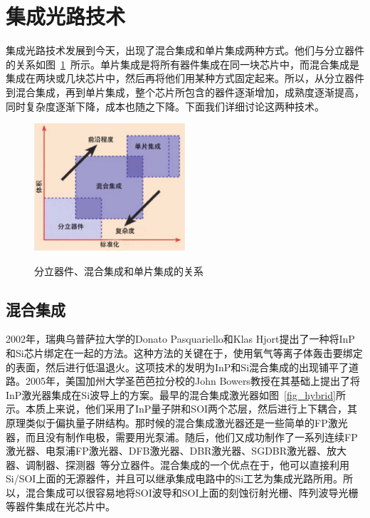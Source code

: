 \documentclass{ZJUthesis}
\begin{document}
\section{集成光路技术}

集成光路技术发展到今天，出现了混合集成和单片集成两种方式。他们与分立器件的关系如图~\ref{fig_integrations}~所示。单片集成是将所有器件集成在同一块芯片中，而混合集成是集成在两块或几块芯片中，然后再将他们用某种方式固定起来。所以，从分立器件到混合集成，再到单片集成，整个芯片所包含的器件逐渐增加，成熟度逐渐提高，同时复杂度逐渐下降，成本也随之下降。下面我们详细讨论这两种技术。

\begin{figure}[htbp]
  \centering
  \includegraphics[width=0.5\textwidth]{./Pictures/integrations.eps}\\
  \caption{分立器件、混合集成和单片集成的关系}
  \label{fig_integrations}
\end{figure}

\subsection{混合集成}

2002年，瑞典乌普萨拉大学的Donato Pasquariello和Klas Hjort提出了一种将InP和Si芯片绑定在一起的方法\cite{Pasquariello2002Plasma}。这种方法的关键在于，使用氧气等离子体轰击要绑定的表面，然后进行低温退火。这项技术的发明为InP和Si混合集成的出现铺平了道路。2005年，美国加州大学圣芭芭拉分校的John Bowers教授在其基础上提出了将InP激光器集成在Si波导上的方案\cite{Park2005Hybrid}。最早的混合集成激光器如图~\ref{fig_hybrid}所示。本质上来说，他们采用了InP量子阱和SOI两个芯层，然后进行上下耦合，其原理类似于偏执量子阱结构。那时候的混合集成激光器还是一些简单的FP激光器，而且没有制作电极，需要用光泵浦。随后，他们又成功制作了一系列连续FP激光器\cite{Fang2006A}、电泵浦FP激光器\cite{Fang2006Electrically}、DFB激光器\cite{Srinivasan2011Design}、DBR激光器\cite{Fang2008A}、SGDBR激光器\cite{Sysak2008Integration}、放大器\cite{Sysak2008Integration}、调制器\cite{Kuo2008High}、探测器\cite{Park2007A}~等分立器件。混合集成的一个优点在于，他可以直接利用Si/SOI上面的无源器件，并且可以继承集成电路中的Si工艺为集成光路所用。所以，混合集成可以很容易地将SOI波导和SOI上面的刻蚀衍射光栅、阵列波导光栅等器件集成在光芯片中。
\end{document}
